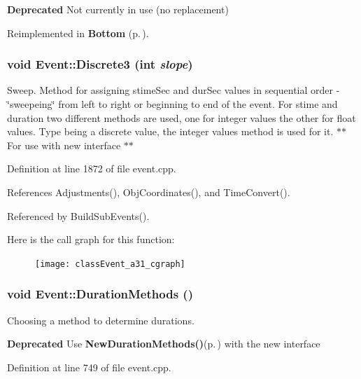 \begin{Desc}
\item[{\bf Deprecated}]Not currently in use (no replacement) \end{Desc}


Reimplemented in {\bf Bottom} {\rm (p.\,\pageref{classBottom_a11})}.
\subsubsection{\setlength{\rightskip}{0pt plus 5cm}void Event::Discrete3 (int {\em slope})}\label{classEvent_a31}


Sweep. Method for assigning stime\-Sec and dur\-Sec values in sequential order - \char`\"{}sweepeing\char`\"{} from left to right or beginning to end of the event. For stime and duration two different methods are used, one for integer values the other for float values. Type being a discrete value, the integer values method is used for it. $\ast$$\ast$ For use with new interface $\ast$$\ast$ 

Definition at line 1872 of file event.cpp.

References Adjustments(), Obj\-Coordinates(), and Time\-Convert().

Referenced by Build\-Sub\-Events().

Here is the call graph for this function:\begin{figure}[H]
\begin{center}
\leavevmode
\texttt{[image: classEvent\_a31\_cgraph]}
\end{center}
\end{figure}
\subsubsection{\setlength{\rightskip}{0pt plus 5cm}void Event::Duration\-Methods ()}\label{classEvent_a35}


Choosing a method to determine durations. 

\begin{Desc}
\item[{\bf Deprecated}]Use {\bf New\-Duration\-Methods()}{\rm (p.\,\pageref{classEvent_a36})} with the new interface \end{Desc}


Definition at line 749 of file event.cpp.

